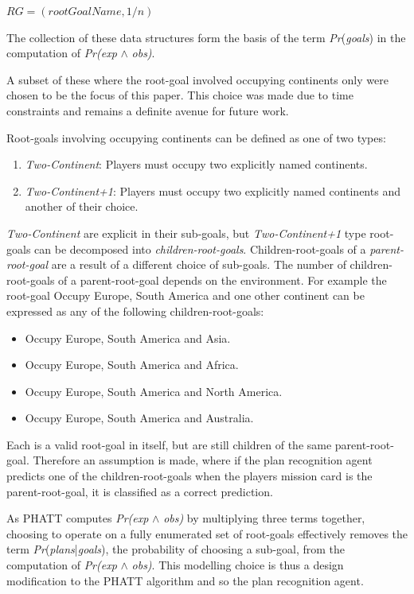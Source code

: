 \documentclass[parskip]{cs4rep}
\begin{document}
\centerline{
 $RG = ( rootGoalName, 1/n)$\newline
}

The collection of these data structures form the basis of the term \textit{Pr}(\textit{goals}) in the computation of \textit{Pr(exp} $\wedge$ \textit{obs)}.

A subset of these where the root-goal involved occupying continents only were chosen to be the focus of this paper. This choice was made due to time constraints and remains a definite avenue for future work. 

Root-goals involving occupying continents can be defined as one of two types:

\begin{enumerate}
\item
\textit{Two-Continent}: Players must occupy two explicitly named continents.
\item
\textit{Two-Continent+1}: Players must occupy two explicitly named continents and another of their choice.
\end{enumerate}

\textit{Two-Continent} are explicit in their sub-goals, but \textit{Two-Continent+1} type root-goals can be decomposed into \textit{children-root-goals}. Children-root-goals of a \textit{parent-root-goal} are a result of a different choice of sub-goals. The number of children-root-goals of a parent-root-goal depends on the environment. For example the root-goal Occupy Europe, South America and one other continent can be expressed as any of the following children-root-goals:

\begin{itemize}
\item
Occupy Europe, South America and Asia.
\item
Occupy Europe, South America and Africa.
\item
Occupy Europe, South America and North America.
\item
Occupy Europe, South America and Australia.\newline
\end{itemize}

Each is a valid root-goal in itself, but are still children of the same parent-root-goal. Therefore an assumption is made, where if the plan recognition agent predicts one of the children-root-goals when the players mission card is the parent-root-goal, it is classified as a correct prediction.

As PHATT computes \textit{Pr(exp} $\wedge$ \textit{obs)} by multiplying three terms together, choosing to operate on a fully enumerated set of root-goals effectively removes the term \textit{Pr}(\textit{plans}|\textit{goals}), the probability of choosing a sub-goal, from the computation of \textit{Pr(exp} $\wedge$ \textit{obs)}. This modelling choice is thus a design modification to the PHATT algorithm and so the plan recognition agent.
\end{document}
